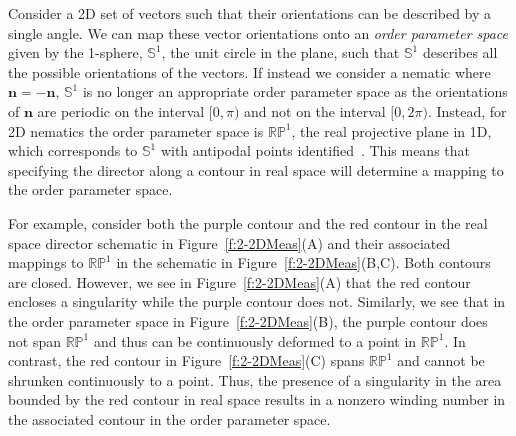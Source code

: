 Consider a 2D set of vectors such that their orientations can be described by a single angle.
We can map these vector orientations onto an \emph{order parameter space} given by the 1-sphere, $\mathbb{S}^1$, the unit circle in the plane, such that $\mathbb{S}^1$ describes all the possible orientations of the vectors.
If instead we consider a nematic where $\mathbf{n} = -\mathbf{n}$, $\mathbb{S}^1$ is no longer an appropriate order parameter space as the orientations of $\mathbf{n}$ are periodic on the interval $[0,\pi)$ and not on the interval $[0,2 \pi)$.
Instead, for 2D nematics the order parameter space is $\mathbb{R}\mathbb{P}^1$, the real projective plane in 1D, which corresponds to $\mathbb{S}^1$ with antipodal points identified~\cite{RN196,RN153,RN236}.
This means that specifying the director along a contour in real space will determine a mapping to the order parameter space.

For example, consider both the purple contour and the red contour in the real space director schematic in Figure~\ref{f:2-2DMeas}(A) and their associated mappings to $\mathbb{R}\mathbb{P}^1$ in the schematic in Figure~\ref{f:2-2DMeas}(B,C).
Both contours are closed.
However, we see in Figure~\ref{f:2-2DMeas}(A) that the red contour encloses a singularity while the purple contour does not.
Similarly, we see that in the order parameter space in Figure~\ref{f:2-2DMeas}(B), the purple contour does not span $\mathbb{RP}^1$ and thus can be continuously deformed to a point in $\mathbb{R}\mathbb{P}^1$.
In contrast, the red contour in Figure~\ref{f:2-2DMeas}(C) spans $\mathbb{RP}^1$ and cannot be shrunken continuously to a point.
Thus, the presence of a singularity in the area bounded by the red contour in real space results in a nonzero winding number in the associated contour in the order parameter space.

